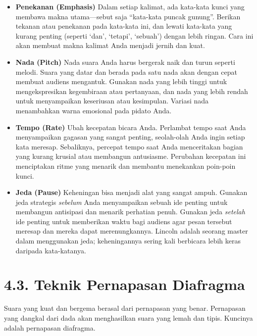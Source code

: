 \documentclass[
  letterpaper,
  DIV=11,
  numbers=noendperiod]{scrreprt}
\begin{document}
\begin{itemize}
\item
  \textbf{Penekanan (Emphasis)} Dalam setiap kalimat, ada kata-kata
  kunci yang membawa makna utama---sebut saja ``kata-kata puncak
  gunung''. Berikan tekanan atau penekanan pada kata-kata ini, dan
  lewati kata-kata yang kurang penting (seperti `dan', `tetapi',
  `sebuah') dengan lebih ringan. Cara ini akan membuat makna kalimat
  Anda menjadi jernih dan kuat.
\item
  \textbf{Nada (Pitch)} Nada suara Anda harus bergerak naik dan turun
  seperti melodi. Suara yang datar dan berada pada satu nada akan dengan
  cepat membuat audiens mengantuk. Gunakan nada yang lebih tinggi untuk
  mengekspresikan kegembiraan atau pertanyaan, dan nada yang lebih
  rendah untuk menyampaikan keseriusan atau kesimpulan. Variasi nada
  menambahkan warna emosional pada pidato Anda.
\item
  \textbf{Tempo (Rate)} Ubah kecepatan bicara Anda. Perlambat tempo saat
  Anda menyampaikan gagasan yang sangat penting, seolah-olah Anda ingin
  setiap kata meresap. Sebaliknya, percepat tempo saat Anda menceritakan
  bagian yang kurang krusial atau membangun antusiasme. Perubahan
  kecepatan ini menciptakan ritme yang menarik dan membantu menekankan
  poin-poin kunci.
\item
  \textbf{Jeda (Pause)} Keheningan bisa menjadi alat yang sangat ampuh.
  Gunakan jeda strategis \emph{sebelum} Anda menyampaikan sebuah ide
  penting untuk membangun antisipasi dan menarik perhatian penuh.
  Gunakan jeda \emph{setelah} ide penting untuk memberikan waktu bagi
  audiens agar pesan tersebut meresap dan mereka dapat merenungkannya.
  Lincoln adalah seorang master dalam menggunakan jeda; keheningannya
  sering kali berbicara lebih keras daripada kata-katanya.
\end{itemize}

\section{\texorpdfstring{\textbf{4.3. Teknik Pernapasan
Diafragma}}{4.3. Teknik Pernapasan Diafragma}}\label{teknik-pernapasan-diafragma}

Suara yang kuat dan bergema berasal dari pernapasan yang benar.
Pernapasan yang dangkal dari dada akan menghasilkan suara yang lemah dan
tipis. Kuncinya adalah pernapasan diafragma.
\end{document}
